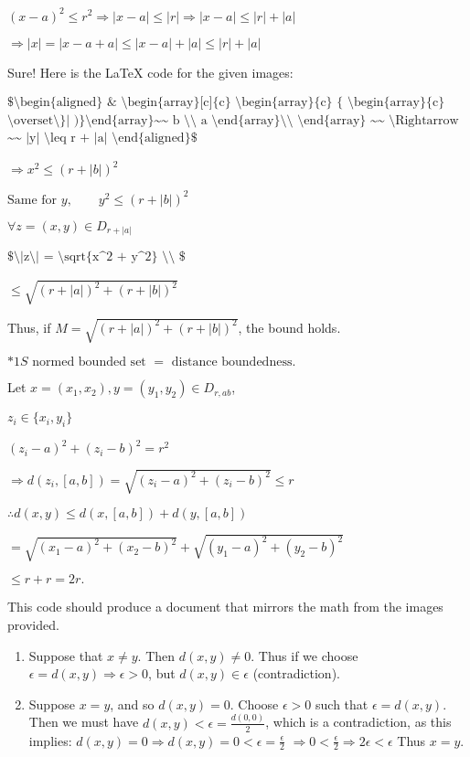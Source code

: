 \documentclass{article}
\theoremstyle{definition}
\numberwithin{equation}{section}
\begin{document}
$
(x - a)^2 \leq r^2 \Rightarrow |x - a| \leq |r| \Rightarrow |x - a| \leq |r| + |a|
$

$
\Rightarrow |x| = |x - a + a| \leq |x - a| + |a| \leq |r| + |a|
$

Sure! Here is the LaTeX code for the given images:

$
\begin{aligned}
& \begin{array}[c]{c}
\begin{array}{c}
{ \begin{array}{c} \overset\}| )}\end{array}~~ b \\ 
a
\end{array}\\
\end{array}
~~ \Rightarrow ~~ |y| \leq r + |a|
\end{aligned}
$

$
\Rightarrow x^2 \leq (r + |b|)^2
$

$
\text{Same for } y, \qquad y^2 \leq (r + |b|)^2
$

$
\forall z = (x, y) \in D_{r+|a|}
$

$
\|z\| = \sqrt{x^2 + y^2} \\
$

$
\leq \sqrt{ (r + |a|)^2 + (r + |b|)^2 }
$

\noindent Thus, if \( M = \sqrt{(r + |a|)^2 + (r+|b|)^2} \), the bound holds.

$
* 1S \text{{ normed bounded set }} = \text{{ distance boundedness.} }
$

\noindent Let \( x = (x_1, x_2), y = (y_1, y_2) \in D_ {r, ab} \),

\qquad \( z_i \in \{x_i, y_i\} \)

$
(z_i - a)^2 + (z_i - b)^2 = r^2
$

$
\Rightarrow d(z_i, [a, b]) = \sqrt{ (z_i - a)^2 + (z_i - b)^2 } \leq r
$

$
\therefore d(x,y) \leq d(x,[a,b]) + d(y, [a,b])
$

$
= \sqrt{(x_1 - a)^2 + (x_2 - b)^2} + \sqrt{(y_1 - a)^2 + (y_2 - b)^2 } 
$

$
\leq r + r = 2r. 
$

This code should produce a document that mirrors the math from the images provided.
\begin{enumerate}
    \item[(iii)] Suppose that $x \neq y$. Then $d(x, y) \neq 0$. Thus if we choose $\epsilon = d(x, y) \Rightarrow \epsilon > 0$, but $d(x, y) \in \epsilon$ (contradiction).
    \item[(contradiction)] Suppose $x = y$, and so $d(x, y) = 0$. Choose $\epsilon > 0$ such that $\epsilon = d(x, y)$. Then we must have $d(x, y) < \epsilon = \frac{d(0, 0)}{2}$, which is a contradiction, as this implies:
    $
    d(x, y) = 0 \Rightarrow d(x, y) = 0 < \epsilon = \frac{\epsilon}{2}
    $
    $
    \Rightarrow 0 < \frac{\epsilon}{2} \Rightarrow 2 \epsilon < \epsilon
    $
    Thus $x = y$.
\end{enumerate}
\end{document}

